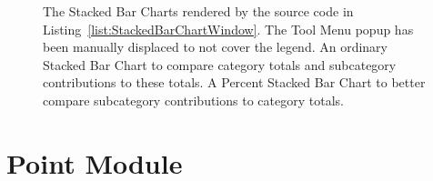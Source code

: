 \begin{figure}[tp]
\centering
{}
\hspace{1cm}
\caption[Stacked Bar Chart Window Example]{%
The Stacked Bar Charts rendered by the source code in
Listing~\ref{list:StackedBarChartWindow}.  The Tool Menu popup has
been manually displaced to not cover the legend.
 An ordinary Stacked Bar Chart to
compare category totals and subcategory contributions to these totals.
 A Percent Stacked Bar Chart to
better compare subcategory contributions to category totals.
}
\label{fig:StackedBarChartWindow}
\end{figure}
  





\section{Point Module}


